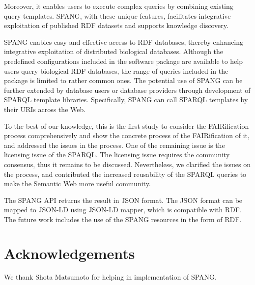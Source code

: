 \documentclass[runningheads]{llncs}
\begin{document}
Moreover, it enables users to execute complex queries by combining existing query templates. SPANG, with these unique features, facilitates integrative exploitation of published RDF datasets and supports knowledge discovery. 

SPANG enables easy and effective access to RDF databases, thereby enhancing integrative exploitation of distributed biological databases.
Although the predefined configurations included in the software package are available to help users query biological RDF databases, 
the range of queries included in the package is limited to rather common ones.
The potential use of SPANG can be further extended by database users or database providers through development of SPARQL template libraries.
Specifically, SPANG can call SPARQL templates by their URIs across the Web.

To the best of our knowledge, this is the first study to consider the FAIRification process comprehensively and show the concrete process of the FAIRification of it, and addressed the issues in the process. One of the remaining issue is the licensing issue of the SPARQL. The licensing issue requires the community consensus, thus it remains to be discussed. Nevertheless, we clarified the issues on the process, and contributed the increased reusability of the SPARQL queries to make the Semantic Web more useful community.

The SPANG API returns the result in JSON format. The JSON format can be mapped to JSON-LD using JSON-LD mapper, which is compatible with RDF. The future work includes the use of the SPANG resources in the form of RDF.


\section*{Acknowledgements}
We thank Shota Matsumoto for helping in implementation of SPANG.




\end{document}
